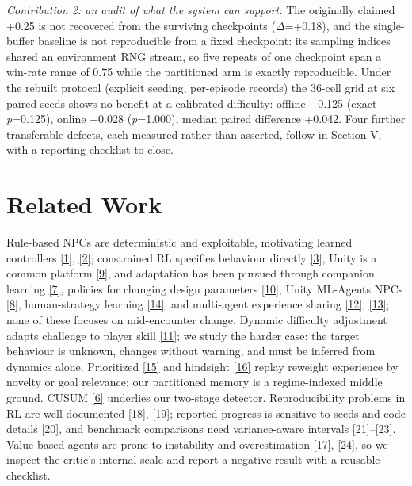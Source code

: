 \documentclass[conference,9pt]{IEEEtran}
\begin{document}
\textit{Contribution 2: an audit of what the system can support.} The originally claimed +0.25 is not recovered from the surviving checkpoints ($\Delta$=+0.18), and the single-buffer baseline is not reproducible from a fixed checkpoint: its sampling indices shared an environment RNG stream, so five repeats of one checkpoint span a win-rate range of 0.75 while the partitioned arm is exactly reproducible. Under the rebuilt protocol (explicit seeding, per-episode records) the 36-cell grid at six paired seeds shows no benefit at a calibrated difficulty: offline $-$0.125 (exact \textit{p}=0.125), online $-$0.028 (\textit{p}=1.000), median paired difference +0.042. Four further transferable defects, each measured rather than asserted, follow in Section V, with a reporting checklist to close.

\section{Related Work}

Rule-based NPCs are deterministic and exploitable, motivating learned controllers \hyperlink{cite.ref1}{[1]}, \hyperlink{cite.ref2}{[2]}; constrained RL specifies behaviour directly \hyperlink{cite.ref3}{[3]}, Unity is a common platform \hyperlink{cite.ref9}{[9]}, and adaptation has been pursued through companion learning \hyperlink{cite.ref7}{[7]}, policies for changing design parameters \hyperlink{cite.ref10}{[10]}, Unity ML-Agents NPCs \hyperlink{cite.ref8}{[8]}, human-strategy learning \hyperlink{cite.ref14}{[14]}, and multi-agent experience sharing \hyperlink{cite.ref12}{[12]}, \hyperlink{cite.ref13}{[13]}; none of these focuses on mid-encounter change. Dynamic difficulty adjustment adapts challenge to player skill \hyperlink{cite.ref11}{[11]}; we study the harder case: the target behaviour is unknown, changes without warning, and must be inferred from dynamics alone. Prioritized \hyperlink{cite.ref15}{[15]} and hindsight \hyperlink{cite.ref16}{[16]} replay reweight experience by novelty or goal relevance; our partitioned memory is a regime-indexed middle ground. CUSUM \hyperlink{cite.ref6}{[6]} underlies our two-stage detector. Reproducibility problems in RL are well documented \hyperlink{cite.ref18}{[18]}, \hyperlink{cite.ref19}{[19]}; reported progress is sensitive to seeds and code details \hyperlink{cite.ref20}{[20]}, and benchmark comparisons need variance-aware intervals \hyperlink{cite.ref21}{[21]}--\hyperlink{cite.ref23}{[23]}. Value-based agents are prone to instability and overestimation \hyperlink{cite.ref17}{[17]}, \hyperlink{cite.ref24}{[24]}, so we inspect the critic's internal scale and report a negative result with a reusable checklist.
\end{document}
